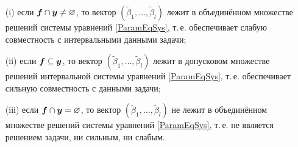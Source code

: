 \documentclass[a5paper,openany]{book}
\newcommand{\mbf}[1]{\protect\text{\boldmath$#1$}}
\begin{document}
\begin{itemize} 
\item[(i)] 
если $\mbf{f}\cap\mbf{y}\neq\varnothing$, то вектор $(\tilde{\beta}_{1}, \ldots, 
\tilde{\beta}_{l})$ лежит в объединённом множестве решений системы уравнений 
\eqref{ParamEqSys}, т.\,е. обеспечивает слабую совместность с интервальными 
данными задачи; 
\item[(ii)]  
если $\mbf{f}\subseteq\mbf{y}$, то вектор $(\tilde{\beta}_{1}, \ldots, 
\tilde{\beta}_{l})$ лежит в допусковом множестве решений интервальной системы 
уравнений \eqref{ParamEqSys}, т.\,е. обеспечивает сильную совместность с данными 
задачи; 
\item[(iii)]  
если $\mbf{f}\cap\mbf{y} = \varnothing$, то вектор $(\tilde{\beta}_{1}, \ldots, 
\tilde{\beta}_{l})$ не лежит в объединённом множестве решений системы уравнений 
\eqref{ParamEqSys}, т.\,е. не является решением задачи, ни сильным, ни слабым. 
\end{itemize} 
   
\end{document}
